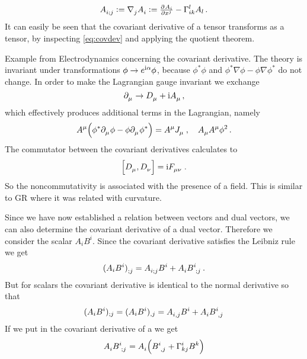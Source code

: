 \begin{equation}
\tensor{A}{_i_;_j}:=\tensor{\nabla}{_j}\tensor{A}{_i}:=\pd{{A_i}}{{x^j}}-\affin{l}{i}{k}A_l\,
.
\end{equation}
It can easily be seen that the covariant derivative of a tensor transforms as a
tensor, by inspecting \eqref{eq:covdev} and applying the quotient theorem.
\begin{remark} Example from Electrodynamics concerning the covariant derivative. 
The theory is invariant under transformations $\phi\to e^{\mathrm{i} \alpha}\phi$, 
because $\phi^*\phi$ and $\phi^*\nabla\phi-\phi\nabla\phi^*$ do not change.
In order to make the Lagrangian gauge invariant we exchange
\begin{equation}
\tensor{\partial}{_\mu}\to\tensor{D}{_\mu}+\imI\tensor{A}{_\mu}\, ,
\end{equation}
which effectively produces additional terms in the Lagrangian, namely
\begin{equation}
\tensor{A}{^\mu}\left(\phi^*\tensor{\partial}{_\mu}\phi
-\phi\tensor{\partial}{_\mu}\phi^*\right)=\tensor{A}{^\mu}\tensor{J}{_\mu}\,,
\quad\tensor{A}{_\mu}\tensor{A}{^\mu}\phi^2\,.
\end{equation}
The commutator between the covariant derivatives calculates to  
\begin{equation}
\left[\tensor{D}{_\mu},\tensor{D}{_\nu}\right]=\imI \tensor{F}{_\mu_\nu}\,.
\end{equation}
So the noncommutativity is associated with the presence of a field. This is
similar to GR where it was related with curvature. 
\end{remark}
Since we have now established a relation between vectors and dual vectors, we
can also determine the covariant derivative of a dual vector. Therefore we
consider the scalar $A_iB^i$. Since the covariant derivative satisfies the
Leibniz rule we get
\begin{align}
\tensor{(A_iB^i)}{_{;j}} =
\tensor{A}{_i_;_j}\tensor{B}{^i}+\tensor{A}{_i}\tensor{B}{^i_;_j}\,.
\end{align}
But for scalars the covariant derivative is identical to the normal derivative
so that 
\begin{align}
(A_iB^i)_{;j} =(A_iB^i)_{,j}=
\tensor{A}{_i_,_j}\tensor{B}{^i}+\tensor{A}{_i}\tensor{B}{^i_,_j}
\end{align}
If we put in the covariant derivative of a we get 
\begin{equation}
\tensor{A}{_i}\tensor{B}{^i_;_j}=\tensor{A}{_i}\left(\tensor{B}{^i_{,j}}+\Gamma^i_{kj}\tensor{B}{^k}\right)
\end{equation}
